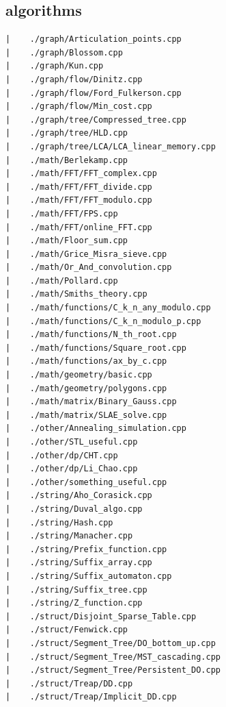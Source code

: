 \documentclass[a4paper, 10pt]{article}
\begin{document}
\begin{center}
\section*{algorithms}
\begin{verbatim}
|    ./graph/Articulation_points.cpp
|    ./graph/Blossom.cpp
|    ./graph/Kun.cpp
|    ./graph/flow/Dinitz.cpp
|    ./graph/flow/Ford_Fulkerson.cpp
|    ./graph/flow/Min_cost.cpp
|    ./graph/tree/Compressed_tree.cpp
|    ./graph/tree/HLD.cpp
|    ./graph/tree/LCA/LCA_linear_memory.cpp
|    ./math/Berlekamp.cpp
|    ./math/FFT/FFT_complex.cpp
|    ./math/FFT/FFT_divide.cpp
|    ./math/FFT/FFT_modulo.cpp
|    ./math/FFT/FPS.cpp
|    ./math/FFT/online_FFT.cpp
|    ./math/Floor_sum.cpp
|    ./math/Grice_Misra_sieve.cpp
|    ./math/Or_And_convolution.cpp
|    ./math/Pollard.cpp
|    ./math/Smiths_theory.cpp
|    ./math/functions/C_k_n_any_modulo.cpp
|    ./math/functions/C_k_n_modulo_p.cpp
|    ./math/functions/N_th_root.cpp
|    ./math/functions/Square_root.cpp
|    ./math/functions/ax_by_c.cpp
|    ./math/geometry/basic.cpp
|    ./math/geometry/polygons.cpp
|    ./math/matrix/Binary_Gauss.cpp
|    ./math/matrix/SLAE_solve.cpp
|    ./other/Annealing_simulation.cpp
|    ./other/STL_useful.cpp
|    ./other/dp/CHT.cpp
|    ./other/dp/Li_Chao.cpp
|    ./other/something_useful.cpp
|    ./string/Aho_Corasick.cpp
|    ./string/Duval_algo.cpp
|    ./string/Hash.cpp
|    ./string/Manacher.cpp
|    ./string/Prefix_function.cpp
|    ./string/Suffix_array.cpp
|    ./string/Suffix_automaton.cpp
|    ./string/Suffix_tree.cpp
|    ./string/Z_function.cpp
|    ./struct/Disjoint_Sparse_Table.cpp
|    ./struct/Fenwick.cpp
|    ./struct/Segment_Tree/DO_bottom_up.cpp
|    ./struct/Segment_Tree/MST_cascading.cpp
|    ./struct/Segment_Tree/Persistent_DO.cpp
|    ./struct/Treap/DD.cpp
|    ./struct/Treap/Implicit_DD.cpp
\end{verbatim}

\end{center}
\end{document}
